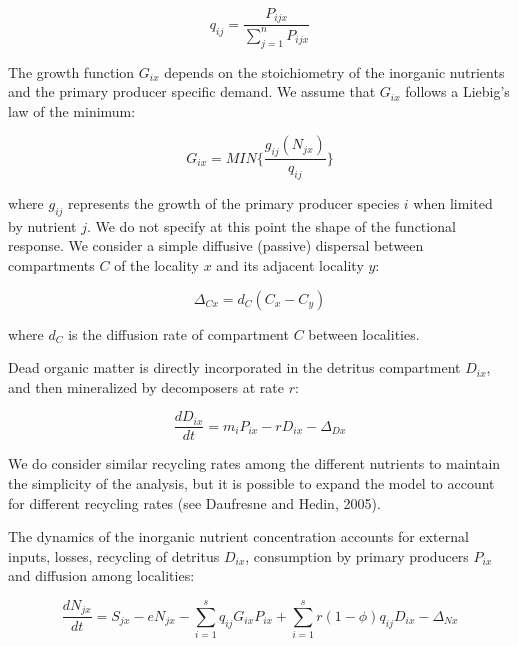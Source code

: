 \documentclass[letterpaper,twocolumn,showkeys]{revtex4-1}
\begin{document}
\begin{equation}
	\label{e:bnet}
	q_{ij}=\frac{P_{ijx}}{\sum_{j=1}^{n}P_{ijx}}
\end{equation}

The growth function $G_{ix}$ depends on the stoichiometry of the inorganic nutrients and the primary producer specific demand. We assume that $G_{ix}$ follows a Liebig’s law of the minimum:

\begin{equation}
	\label{e:bnet}
	G_{ix}=MIN\{\frac{g_{ij}(N_{jx})}{q_{ij}}\}
\end{equation}

where $g_{ij}$ represents the growth of the primary producer species $i$ when limited by nutrient $j$. We do not specify at this point the shape of the functional response. We consider a simple diffusive (passive) dispersal between compartments $C$ of the locality $x$ and its adjacent locality $y$: 

\begin{equation}
	\label{e:bnet}
	\Delta_{Cx}=d_{C}(C_{x}-C_{y})
\end{equation}

where $d_{C}$ is the diffusion rate of compartment $C$ between localities.  

Dead organic matter is directly incorporated in the detritus compartment $D_{ix}$, and then mineralized by decomposers at rate $r$:

\begin{equation}
	\label{e:bnet}
	\frac{dD_{ix}}{dt}=m_{i}P_{ix}-rD_{ix}-\Delta_{Dx}
\end{equation}

We do consider similar recycling rates among the different nutrients to maintain the simplicity of the analysis, but it is possible to expand the model to account for different recycling rates (see Daufresne and Hedin, 2005). 

The dynamics of the inorganic nutrient concentration accounts for external inputs, losses, recycling of detritus $D_{ix}$, consumption by primary producers $P_{ix}$ and diffusion among localities: 

\begin{equation}
	\label{e:bnet}
	\frac{dN_{jx}}{dt}=S_{jx}-eN_{jx}-\sum_{i=1}^{s}q_{ij}G_{ix}P_{ix}+\sum_{i=1}^{s}r(1-\phi)q_{ij}D_{ix}-\Delta_{Nx}
\end{equation}
\end{document}
